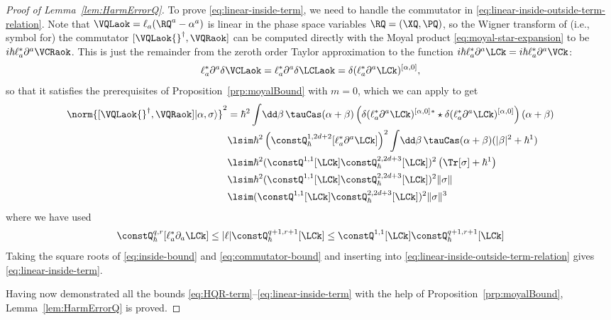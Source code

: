 \documentclass{article}
\numberwithin{equation}{section}
\begin{document}
\begin{proof}[Proof of Lemma~\ref{lem:HarmErrorQ}]
	To prove \eqref{eq:linear-inside-term}, 
	we need to handle the commutator in \eqref{eq:linear-inside-outside-term-relation}.
	Note that $\VQLaok = \ell_a (\RQ^a-\alpha^a)$ is linear in the phase space variables $\RQ = (\XQ,\PQ)$, so the Wigner transform of (i.e., symbol for) the commutator $[\VQLaok{}^\dagger,  \VQRaok]$ can be computed directly with the Moyal product \eqref{eq:moyal-star-expansion} to be $ i \hbar \ell_a^* \partial^a \VCRaok$.  This is just the remainder from the zeroth order Taylor approximation to the function $i\hbar \ell_a^* \partial^a \LCk =i\hbar \ell_a^* \partial^a \VCk$:
	\begin{align}
		\ell_a^* \partial^a \delta \VCLaok 
		= \ell_a^* \partial^a \delta \LCLaok 
		= \delta(\ell_a^* \partial^a  \LCk)^{[\alpha,0]}, 
	\end{align}
	so that it satisfies the prerequisites of Proposition~\ref{prp:moyalBound} with $m=0$, which we can apply to get
	\begin{align}
		\norm{[\VQLaok{}^\dagger,  \VQRaok]|\alpha,\sigma \rangle }^2
		& = \hbar^2 \int \!\dd \beta\, \tauCas(\alpha+\beta) 
		\left( \delta(\ell_a^* \partial^a  \LCk)^{[\alpha,0]}{}^* \star  \delta(\ell_a^* \partial^a  \LCk)^{[\alpha,0]}\right)(\alpha+\beta)\\
		&\lsim  \hbar^2 
		\left(\constQ^{1,2d+2}_{\hbar}[\ell_a^* \partial^a \LCk]\right)^2 
		\int \!\dd \beta\, \tauCas(\alpha+\beta) (|\beta|^{2} + \hbar^{1})\\
		&\lsim  \hbar^2 (\constQ^{1,1}[\LCk] \constQ^{2,2d+3}_{\hbar}[\LCk])^2 
		\left(\Tr[\sigma] +\hbar^{1}\right) \\
		&\lsim
  \hbar^2 (\constQ^{1,1}[\LCk] \constQ^{2,2d+3}_{\hbar}[\LCk])^2 
		\|\sigma\| \\
		\label{eq:commutator-bound}
		&\lsim (\constQ^{1,1}[\LCk] \constQ^{2,2d+3}_{\hbar}[\LCk])^2  \|\sigma\|^3
	\end{align}
	where we have used 
	\begin{align}
		\constQ^{q,r}_{\hbar}[\ell_a^*\partial_a \LCk] \leq |\ell| \constQ^{q+1,r+1}_{\hbar}[\LCk] \le \constQ^{1,1}[\LCk] \constQ^{q+1,r+1}_{\hbar}[\LCk]
	\end{align}
	Taking the square roots of \eqref{eq:inside-bound} and \eqref{eq:commutator-bound} and inserting into  \eqref{eq:linear-inside-outside-term-relation} gives \eqref{eq:linear-inside-term}.

 
	

    Having now demonstrated all the bounds \eqref{eq:HQR-term}--\eqref{eq:linear-inside-term} with the help of Proposition~\ref{prp:moyalBound}, Lemma~\ref{lem:HarmErrorQ} is proved.
\end{proof}
\end{document}

